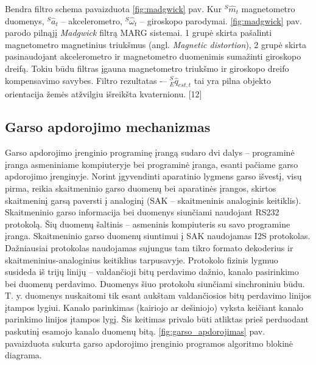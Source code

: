 \documentclass[]{vgtuef}
\begin{document}
Bendra filtro schema pavaizduota \ref{fig:madgwick} pav. Kur $^{S}\hat{m}_{t}$ magnetometro duomenys, $^{S}\hat{a}_{t}$ – akcelerometro, $^{S}\hat{\omega}_{t}$  – giroskopo parodymai. \ref{fig:madgwick} pav. parodo pilnąjį \textit{Madgwick} filtrą MARG sistemai. 1 grupė skirta pašalinti magnetometro magnetinius triukšmus (angl. \textit{Magnetic distortion}), 2 grupė skirta pasinaudojant akcelerometro ir magnetometro duomenimis sumažinti giroskopo dreifą. Tokiu būdu filtras įgauna magnetometro triukšmo ir giroskopo dreifo kompensavimo savybes. Filtro rezultatas -– $_{E}^{S}\hat{q}_{est,t}$ tai yra pilna objekto orientacija žemės atžvilgiu išreikšta kvaternionu. [12]

\subsection{Garso apdorojimo mechanizmas}

Garso apdorojimo įrenginio programinę įrangą sudaro dvi dalys – programinė įranga asmeniniame kompiuteryje bei programinė įranga, esanti pačiame garso apdorojimo įrenginyje. Norint įgyvendinti aparatinio lygmens garso išvestį, visų pirma, reikia skaitmeninio garso duomenų bei aparatinės įrangos, skirtos skaitmeninį garsą paversti į analoginį (SAK – skaitmeninis analoginis keitiklis). Skaitmeninio garso informacija bei duomenys siunčiami naudojant RS232 protokolą. Šių duomenų šaltinis – asmeninis kompiuteris su savo programine įranga. Skaitmeninio garso duomenų siuntimui į SAK naudojamas I2S protokolas. Dažniausiai protokolas naudojamas sujungus tam tikro formato dekoderius ir skaitmeninius-analoginius keitiklius tarpusavyje. Protokolo fizinis lygmuo susideda iš trijų linijų – valdančioji bitų perdavimo dažnio, kanalo pasirinkimo bei duomenų perdavimo. Duomenys šiuo protokolu siunčiami sinchroniniu būdu. T. y. duomenys nuskaitomi tik esant aukštam valdančiosios bitų perdavimo linijos įtampos lygiui. Kanalo parinkimas (kairiojo ar dešiniojo) vyksta keičiant kanalo parinkimo linijos įtampos lygį. Šis keitimas privalo būti atliktas prieš perduodant paskutinį esamojo kanalo duomenų bitą. \ref{fig:garso_apdorojimas} pav. pavaizduota sukurta garso apdorojimo įrenginio programos algoritmo blokinė diagrama.
\end{document}
